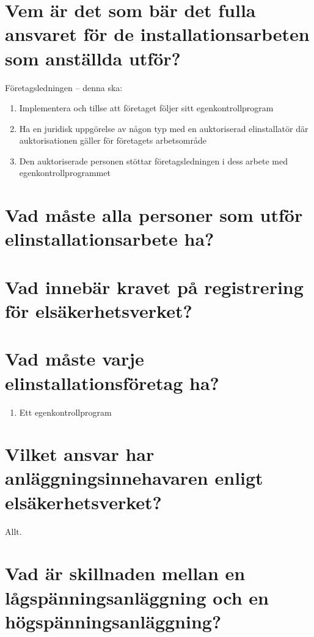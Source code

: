 \documentclass[a4paper,swedish]{article}
\begin{document}
\setcounter{section}{47}
\section{Vem är det som bär det fulla ansvaret för de installationsarbeten som anställda utför?}\label{sec:ansvar_elarbeten}

Företagsledningen -- denna ska:
\begin{enumerate}
\item Implementera och tillse att företaget följer sitt egenkontrollprogram
\item Ha en juridisk uppgörelse av någon typ med en auktoriserad elinstallatör där auktorisationen
  gäller för företagets arbetsområde
\item Den auktoriserade personen stöttar företagsledningen i dess arbete med egenkontrollprogrammet
\end{enumerate}

\setcounter{section}{49}
\section{Vad måste alla personer som utför elinstallationsarbete ha?}

\setcounter{section}{51}
\section{Vad innebär kravet på registrering för elsäkerhetsverket?}

\setcounter{section}{53}
\section{Vad måste varje elinstallationsföretag ha?}\label{sec:designated_person}

\begin{enumerate}
\item Ett egenkontrollprogram
\end{enumerate}

\setcounter{section}{55}
\section{Vilket ansvar har anläggningsinnehavaren enligt elsäkerhetsverket?}\label{sec:innehavarens_ansvar}

Allt.

\setcounter{section}{57}
\section{Vad är skillnaden mellan en lågspänningsanläggning och en högspänningsanläggning?}
\end{document}
